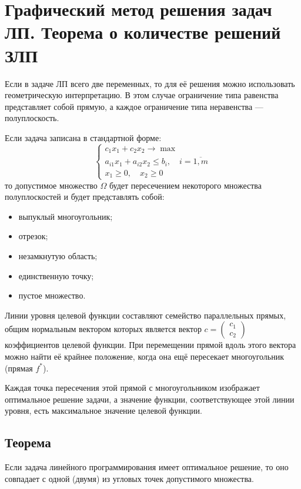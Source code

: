 \documentclass[17pt]{extarticle}
\begin{document}
\section{Графический метод решения задач ЛП. Теорема о количестве решений ЗЛП}

Если в задаче ЛП всего две переменных, то для её решения можно использовать геометрическую интерпретацию. В этом случае ограничение типа равенства представляет собой прямую, а каждое ограничение типа неравенства — полуплоскость.

Если задача записана в стандартной форме:
\[
    \begin{cases}
        c_1 x_1 + c_2 x_2 \to \max                                \\
        a_{i1} x_1 + a_{i2} x_2 \le b_i, \quad i = \overline{1,m} \\
        x_1 \ge 0, \quad x_2 \ge 0
    \end{cases}
\]
то допустимое множество \( \Omega \) будет пересечением некоторого множества полуплоскостей и будет представлять собой:
\begin{itemize}
    \item выпуклый многоугольник;
    \item отрезок;
    \item незамкнутую область;
    \item единственную точку;
    \item пустое множество.
\end{itemize}

Линии уровня целевой функции составляют семейство параллельных прямых, общим нормальным вектором которых является вектор \( c = \begin{pmatrix} c_1 \\ c_2 \end{pmatrix} \) коэффициентов целевой функции. При перемещении прямой вдоль этого вектора можно найти её крайнее положение, когда она ещё пересекает многоугольник (прямая \( f^* \)).

Каждая точка пересечения этой прямой с многоугольником изображает оптимальное решение задачи, а значение функции, соответствующее этой линии уровня, есть максимальное значение целевой функции.

\subsection{Теорема}
\begin{theorem}
    Если задача линейного программирования имеет оптимальное решение, то оно совпадает с одной (двумя) из угловых точек допустимого множества.
\end{theorem}
\end{document}
